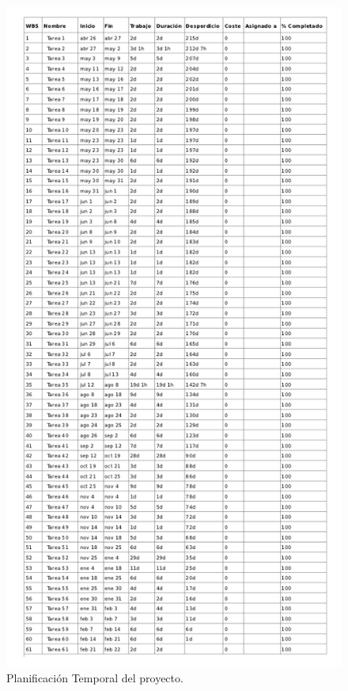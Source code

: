 \pagebreak
\begin{figure}[H]
\begin{center}
\includegraphics[width=11.5cm]{planificacion_graphvisualx_8.png}
\caption{Planificación Temporal del proyecto.}
\end{center}
\end{figure}



